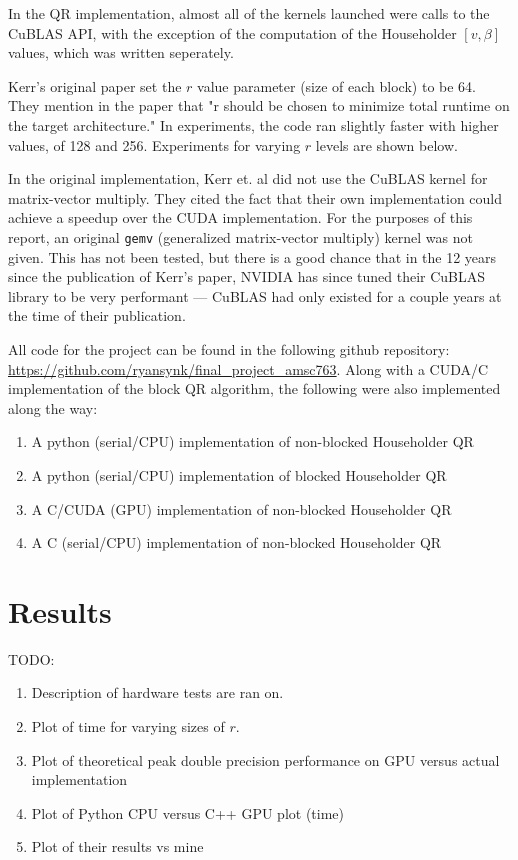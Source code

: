 \documentclass[12pt]{article}
\begin{document}
In the QR implementation, almost all of the kernels launched were calls to the CuBLAS API,
with the exception of the computation of the Householder $[v, \beta]$ values, which was 
written seperately.

Kerr's original paper set the $r$ value parameter (size of each block) to be 64. They
mention in the paper that "r should be chosen to minimize total runtime on the target
architecture." In experiments, the code ran slightly faster with higher values, of 128 and 256.
Experiments for varying $r$ levels are shown below.

In the original implementation, Kerr et. al did not use the CuBLAS kernel for 
matrix-vector multiply. They cited the fact that their own implementation could 
achieve a speedup over the CUDA implementation. For the purposes of this report, 
an original \texttt{gemv} (generalized matrix-vector multiply) kernel was not given. 
This has not been tested, but there is a good chance that in the 12 years since the
publication of Kerr's paper, NVIDIA has since tuned their CuBLAS library to be very
performant --- CuBLAS had only existed for a couple years at the time of their publication.

All code for the project can be found in the following github repository: 
\url{https://github.com/ryansynk/final_project_amsc763}. Along with a 
CUDA/C implementation of the block QR algorithm, the following were also
implemented along the way:
\begin{enumerate}
    \item A python (serial/CPU) implementation of non-blocked Householder QR
    \item A python (serial/CPU) implementation of blocked Householder QR
    \item A C/CUDA (GPU) implementation of non-blocked Householder QR
    \item A C (serial/CPU) implementation of non-blocked Householder QR
\end{enumerate}

\par\null\par

\section*{Results}
\par\null\par
TODO:
\begin{enumerate}
    \item Description of hardware tests are ran on.
    \item Plot of time for varying sizes of $r$.
    \item Plot of theoretical peak double precision performance on GPU versus
        actual implementation
    \item Plot of Python CPU versus C++ GPU plot (time)
    \item Plot of their results vs mine
\end{enumerate}
\end{document}
